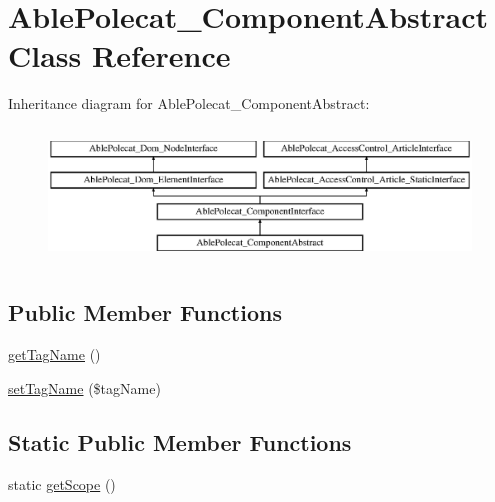 \hypertarget{class_able_polecat___component_abstract}{}\section{Able\+Polecat\+\_\+\+Component\+Abstract Class Reference}
\label{class_able_polecat___component_abstract}
Inheritance diagram for Able\+Polecat\+\_\+\+Component\+Abstract\+:\begin{figure}[H]
\begin{center}
\leavevmode
\includegraphics[height=3.612903cm]{class_able_polecat___component_abstract}
\end{center}
\end{figure}
\subsection*{Public Member Functions}
\begin{DoxyCompactItemize}
\item 
\hyperlink{class_able_polecat___component_abstract_a2a21085426efb4a6c3d9ed4db9f8524c}{get\+Tag\+Name} ()
\item 
\hyperlink{class_able_polecat___component_abstract_aea1e8292a0b88fba2af05b26e503a14c}{set\+Tag\+Name} (\$tag\+Name)
\end{DoxyCompactItemize}
\subsection*{Static Public Member Functions}
\begin{DoxyCompactItemize}
\item 
static \hyperlink{class_able_polecat___component_abstract_ad9ade868bd136d32967059d1cccb3e92}{get\+Scope} ()
\end{DoxyCompactItemize}
